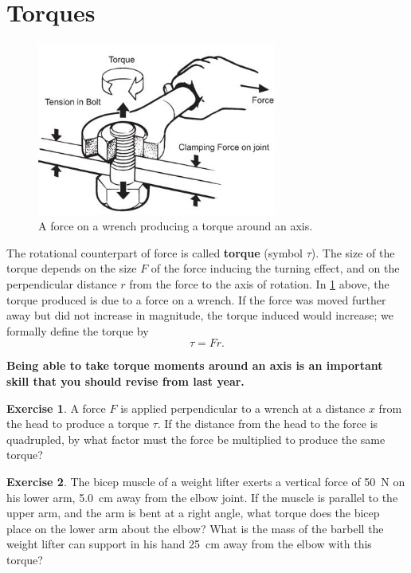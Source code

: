 \documentclass[a4paper]{amsbook}
\theoremstyle{definition}
\newtheorem{exercise}{Exercise}
\numberwithin{exercise}{chapter}
\numberwithin{exercise}{chapter}
\begin{document}
\section{Torques}
\begin{figure}
  \centering
  \includegraphics[width=0.7\textwidth]{torque}
  \caption{A force on a wrench producing a torque around an axis.\label{fig:torque}}
\end{figure}
The rotational counterpart of force is called \textbf{torque} (symbol $ \tau $). The size of the torque depends
on the size $ F $ of the force inducing the turning effect, and on the perpendicular distance $ r $ from the force
to the axis of rotation. In \cref{fig:torque} above, the torque produced is due to a force on a wrench. If the
force was moved further away but did not increase in magnitude, the torque induced would increase; we formally
define the torque by
\begin{equation}
  \tau = Fr.
\end{equation}

\textbf{Being able to take torque moments around an axis is an important skill that you should revise from last year.}

\begin{exercise}
  A force $ F $ is applied perpendicular to a wrench at a distance $ x $ from the head to produce a torque $ \tau $.
  If the distance from the head to the force is quadrupled, by what factor must the force be multiplied to produce the
  same torque?
\end{exercise}

\begin{exercise}
  The bicep muscle of a weight lifter exerts a vertical force of \SI{50}{\newton} on his lower arm, \SI{5.0}{\centi\metre} away from
  the elbow joint. If the muscle is parallel to the upper arm, and the arm is bent at a right angle, what torque does the bicep place
  on the lower arm about the elbow? What is the mass of the barbell the weight lifter can support in his hand \SI{25}{\centi\metre}
  away from the elbow with this torque?
\end{exercise}
\end{document}
